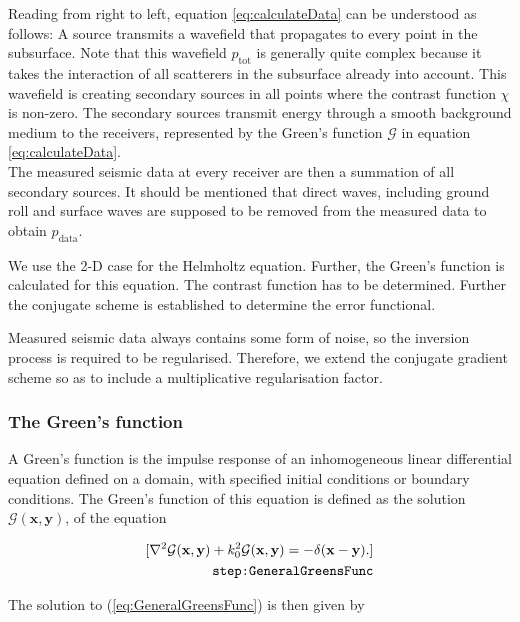 \documentclass[10pt,a4paper]{article}
\begin{document}
Reading from right to left, equation \ref{eq:calculateData} can be understood as
follows: A source transmits a wavefield that propagates to every point
in the subsurface. Note that this wavefield $p_\text{tot}$ is
generally quite complex because it takes the interaction of all
scatterers in the subsurface already into account. This wavefield is
creating secondary sources in all points where the contrast function
$\chi$ is non-zero. The secondary sources transmit energy through a
smooth background medium to the receivers, represented by the Green's
function $\mathcal{G}$ in equation \ref{eq:calculateData}.\\ %
The measured seismic data at every receiver are then a summation of
all secondary sources. It should be mentioned that direct waves,
including ground roll and surface waves are supposed to be removed
from the measured data to obtain $p_\text{data}$.

We use the 2-D case for the Helmholtz equation. Further, the Green's
function is calculated for this equation. The contrast function has to
be determined. Further the conjugate scheme is established to
determine the error functional.

Measured seismic data always contains some form of noise, so the
inversion process is required to be regularised. Therefore, we extend
the conjugate gradient scheme so as to include a multiplicative regularisation factor.

\subsubsection{The Green's function}
A Green's function is the impulse response of an inhomogeneous linear
differential equation defined on a domain, with specified initial
conditions or boundary conditions.
The Green's function of this equation is defined as the solution
$\mathcal{G}(\mathbf{x}, \mathbf{y})$, of the equation

\begin{align}
\label{eq:GeneralGreensFunc}
[ \nabla^2 \mathcal{G}(\mathbf{x}, \mathbf{y}) + k_0^2
\mathcal{G}(\mathbf{x}, \mathbf{y}) = -\delta(\mathbf{x} -
\mathbf{y}). ]\\
\tag*{\texttt{step:GeneralGreensFunc}}
\end{align}

The solution to (\ref{eq:GeneralGreensFunc}) is then given by
\end{document}

